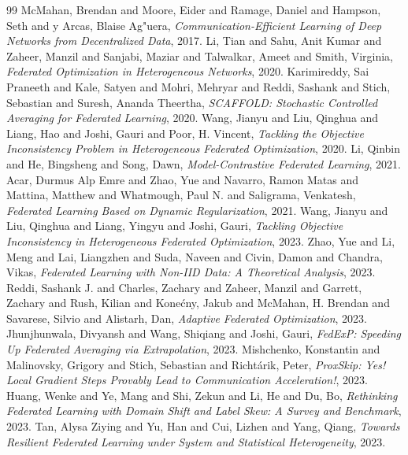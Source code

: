\documentclass[conference]{IEEEtran}
\begin{document}
\begin{thebibliography}{99}
   McMahan, Brendan and Moore, Eider and Ramage, Daniel and Hampson, Seth and y Arcas, Blaise Ag{"u}era, \textit{Communication-Efficient Learning of Deep Networks from Decentralized Data}, 2017.
   Li, Tian and Sahu, Anit Kumar and Zaheer, Manzil and Sanjabi, Maziar and Talwalkar, Ameet and Smith, Virginia, \textit{Federated Optimization in Heterogeneous Networks}, 2020.
   Karimireddy, Sai Praneeth and Kale, Satyen and Mohri, Mehryar and Reddi, Sashank and Stich, Sebastian and Suresh, Ananda Theertha, \textit{SCAFFOLD: Stochastic Controlled Averaging for Federated Learning}, 2020.
   Wang, Jianyu and Liu, Qinghua and Liang, Hao and Joshi, Gauri and Poor, H. Vincent, \textit{Tackling the Objective Inconsistency Problem in Heterogeneous Federated Optimization}, 2020.
   Li, Qinbin and He, Bingsheng and Song, Dawn, \textit{Model-Contrastive Federated Learning}, 2021.
   Acar, Durmus Alp Emre and Zhao, Yue and Navarro, Ramon Matas and Mattina, Matthew and Whatmough, Paul N. and Saligrama, Venkatesh, \textit{Federated Learning Based on Dynamic Regularization}, 2021.
   Wang, Jianyu and Liu, Qinghua and Liang, Yingyu and Joshi, Gauri, \textit{Tackling Objective Inconsistency in Heterogeneous Federated Optimization}, 2023.
   Zhao, Yue and Li, Meng and Lai, Liangzhen and Suda, Naveen and Civin, Damon and Chandra, Vikas, \textit{Federated Learning with Non-IID Data: A Theoretical Analysis}, 2023.
   Reddi, Sashank J. and Charles, Zachary and Zaheer, Manzil and Garrett, Zachary and Rush, Kilian and Kone{\'c}ny, Jakub and McMahan, H. Brendan and Savarese, Silvio and Alistarh, Dan, \textit{Adaptive Federated Optimization}, 2023.
   Jhunjhunwala, Divyansh and Wang, Shiqiang and Joshi, Gauri, \textit{FedExP: Speeding Up Federated Averaging via Extrapolation}, 2023.
   Mishchenko, Konstantin and Malinovsky, Grigory and Stich, Sebastian and Richt{\'a}rik, Peter, \textit{ProxSkip: Yes! Local Gradient Steps Provably Lead to Communication Acceleration!}, 2023.
   Huang, Wenke and Ye, Mang and Shi, Zekun and Li, He and Du, Bo, \textit{Rethinking Federated Learning with Domain Shift and Label Skew: A Survey and Benchmark}, 2023.
   Tan, Alysa Ziying and Yu, Han and Cui, Lizhen and Yang, Qiang, \textit{Towards Resilient Federated Learning under System and Statistical Heterogeneity}, 2023.

\end{thebibliography}
\end{document}
